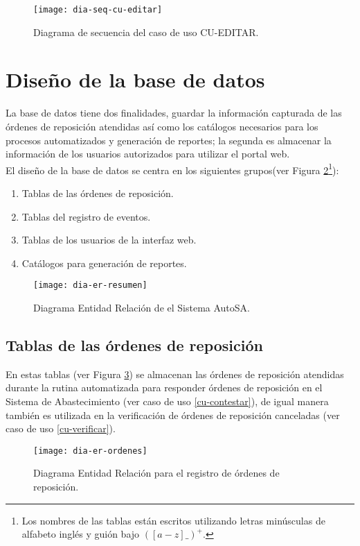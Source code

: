 \begin{figure}[h]
	\centering
	\texttt{[image: dia-seq-cu-editar]}
	\caption{Diagrama de secuencia del caso de uso CU-EDITAR.}
	\label{fig:dia-seq-cu-editar}
\end{figure}



\newpage
\section{Diseño de la base de datos}
La base de datos tiene dos finalidades, guardar la información capturada de las órdenes de reposición atendidas así como los catálogos necesarios para los procesos automatizados y generación de reportes; la segunda es almacenar la información de los usuarios autorizados para utilizar el portal web.\\
El diseño de la base de datos se centra en los siguientes grupos(ver Figura \ref{fig:dia-er-resumen}\footnote{Los nombres de las tablas están escritos utilizando letras minúsculas de alfabeto inglés y guión bajo $([a-z]{\_})^+$.}):
\begin{enumerate}
	\item Tablas de las órdenes de reposición.
	\item Tablas del registro de eventos.
	\item Tablas de los usuarios de la interfaz web.
	\item Catálogos para generación de reportes.
\end{enumerate}
\begin{figure}[h]
  \centering
  \texttt{[image: dia-er-resumen]}
  \caption{Diagrama Entidad Relación de el Sistema AutoSA.}
  \label{fig:dia-er-resumen}
\end{figure}


\subsection{Tablas de las órdenes de reposición}
En estas tablas (ver Figura \ref{fig:dia-er-ordenes}) se almacenan las órdenes de reposición atendidas durante la rutina automatizada para responder órdenes de reposición en el Sistema de Abastecimiento (ver caso de uso \ref{cu-contestar}), de igual manera también es utilizada en la verificación de órdenes de reposición canceladas (ver caso de uso \ref{cu-verificar}).
\begin{figure}[h]
  \centering
  \texttt{[image: dia-er-ordenes]} 
  \caption{Diagrama Entidad Relación para el registro de órdenes de reposición.}
  \label{fig:dia-er-ordenes}
\end{figure}
